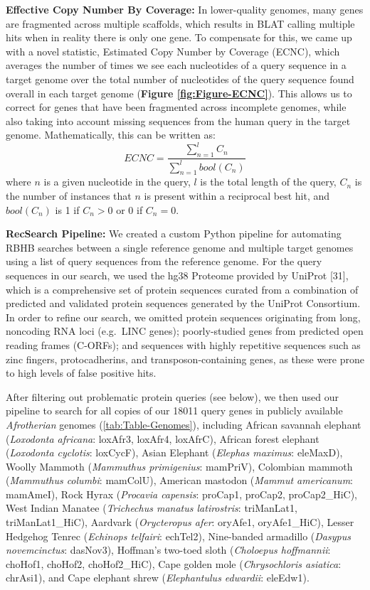\documentclass[]{elsarticle} %
\begin{document}
\textbf{Effective Copy Number By Coverage:} In lower-quality genomes, many genes are fragmented across multiple scaffolds, which results in BLAT calling multiple hits when in reality there is only one gene. To compensate for this, we came up with a novel statistic, Estimated Copy Number by Coverage (ECNC), which averages the number of times we see each nucleotides of a query sequence in a target genome over the total number of nucleotides of the query sequence found overall in each target genome (\textbf{Figure \ref{fig:Figure-ECNC}}). This allows us to correct for genes that have been fragmented across incomplete genomes, while also taking into account missing sequences from the human query in the target genome. Mathematically, this can be written as:\\
\[ ECNC = \frac{\sum_{n=1}^{l} C_n}{\sum_{n=1}^{l} bool(C_n)}\]
where \(n\) is a given nucleotide in the query, \(l\) is the total length of the query, \(C_n\) is the number of instances that \(n\) is present within a reciprocal best hit, and \(bool(C_n)\) is 1 if \(C_n > 0\) or 0 if \(C_n = 0\).

\textbf{RecSearch Pipeline:} We created a custom Python pipeline for automating RBHB searches between a single reference genome and multiple target genomes using a list of query sequences from the reference genome. For the query sequences in our search, we used the hg38 Proteome provided by UniProt {[}31{]}, which is a comprehensive set of protein sequences curated from a combination of predicted and validated protein sequences generated by the UniProt Consortium. In order to refine our search, we omitted protein sequences originating from long, noncoding RNA loci (e.g.~LINC genes); poorly-studied genes from predicted open reading frames (C-ORFs); and sequences with highly repetitive sequences such as zinc fingers, protocadherins, and transposon-containing genes, as these were prone to high levels of false positive hits.

After filtering out problematic protein queries (see below), we then used our pipeline to search for all copies of our 18011 query genes in publicly available \emph{Afrotherian} genomes (\ref{tab:Table-Genomes}), including African savannah elephant (\emph{Loxodonta africana}: loxAfr3, loxAfr4, loxAfrC), African forest elephant (\emph{Loxodonta cyclotis}: loxCycF), Asian Elephant (\emph{Elephas maximus}: eleMaxD), Woolly Mammoth (\emph{Mammuthus primigenius}: mamPriV), Colombian mammoth (\emph{Mammuthus columbi}: mamColU), American mastodon (\emph{Mammut americanum}: mamAmeI), Rock Hyrax (\emph{Procavia capensis}: proCap1, proCap2, proCap2\_HiC), West Indian Manatee (\emph{Trichechus manatus latirostris}: triManLat1, triManLat1\_HiC), Aardvark (\emph{Orycteropus afer}: oryAfe1, oryAfe1\_HiC), Lesser Hedgehog Tenrec (\emph{Echinops telfairi}: echTel2), Nine-banded armadillo (\emph{Dasypus novemcinctus}: dasNov3), Hoffman's two-toed sloth (\emph{Choloepus hoffmannii}: choHof1, choHof2, choHof2\_HiC), Cape golden mole (\emph{Chrysochloris asiatica}: chrAsi1), and Cape elephant shrew (\emph{Elephantulus edwardii}: eleEdw1).
\end{document}
